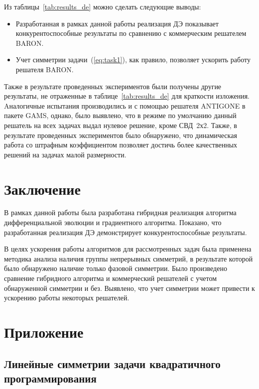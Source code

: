 \documentclass{llncs}
\begin{document}
Из таблицы~\ref{tab:results_de} можно сделать следующие выводы:
\begin{itemize}
  \item Разработанная в рамках данной работы реализация ДЭ показывает конкурентоспособные результаты по сравнению с коммерческим решателем BARON.
  \item Учет симметрии задачи~(\ref{eq:task1}), как правило, позволяет ускорить работу решателя BARON.
\end{itemize}

Также в результате проведенных экспериментов были получены другие результаты, не отраженные в таблице~\ref{tab:results_de} для краткости изложения. Aналогичные испытания производились и с помощью решателя ANTIGONE в пакете GAMS, однако, было выявлено, что в режиме по умолчанию данный решатель на всех задачах выдал нулевое решение, кроме СВД~2х2. Также, в результате проведенных экспериментов было обнаружено, что динамическая работа со штрафным коэффициентом позволяет достичь более качественных решений на задачах малой размерности.

\section{Заключение}\label{sec:conclusion}

В рамках данной работы была разработана гибридная реализация алгоритма дифференциальной эволюции и градиентного алгоритма. Показано, что разработанная реализация ДЭ демонстрирует конкурентоспособные результаты.

В целях ускорения работы алгоритмов для рассмотренных задач была применена методика анализа наличия группы непрерывных симметрий, в результате которой было обнаружено наличие только фазовой симметрии. Было произведено сравнение гибридного алгоритма и коммерческий решателей с учетом обнаруженной симметрии и без. Выявлено, что учет симметрии может привести к ускорению работы некоторых решателей.


\section*{Приложение}\label{sec:sym}
\subsection*{Линейные симметрии задачи квадратичного программирования}\label{sec:sym:mod}
\end{document}
